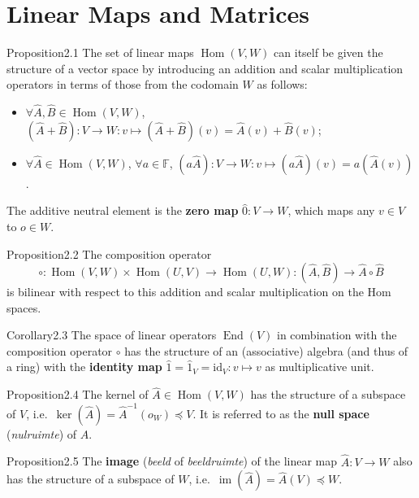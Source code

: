 \section{Linear Maps and Matrices}

\begin{res}{Proposition}{2.1}
The set of linear maps $\operatorname{Hom}(V,W)$ can itself be given the structure of a vector space by introducing an addition and scalar multiplication operators in terms of those from the codomain $W$ as follows:
\begin{itemize}
\item $\forall\hat A,\hat B\in\operatorname{Hom}(V,W)$, $(\hat A+\hat B):V\to W:v\mapsto(\hat A+\hat B)(v)=\hat A(v)+\hat B(v)$;
\item $\forall\hat A\in\operatorname{Hom}(V,W)$, $\forall a\in\mathbb F$, $(a\hat A):V\to W:v\mapsto(a\hat A)(v)=a(\hat A(v))$.
\end{itemize}
The additive neutral element is the \textbf{zero map} $\hat 0:V\to W$, which maps any $v\in V$ to $o\in W$.
\end{res}

\begin{res}{Proposition}{2.2}
The composition operator
\[\circ:\operatorname{Hom}(V,W)\times\operatorname{Hom}(U,V)\to\operatorname{Hom}(U,W):(\hat A,\hat B)\to\hat A\circ\hat B\]
is bilinear with respect to this addition and scalar multiplication on the Hom spaces.
\end{res}

\begin{res}{Corollary}{2.3}
The space of linear operators $\operatorname{End}(V)$ in combination with the composition operator $\circ$ has the structure of an (associative) algebra (and thus of a ring) with the \textbf{identity map} $\hat 1=\hat 1_V=\mathrm{id}_V:v\mapsto v$ as multiplicative unit.
\end{res}

\begin{res}{Proposition}{2.4}
The kernel of $\hat A\in\operatorname{Hom}(V,W)$ has the structure of a subspace of $V$, i.e.\ $\ker(\hat A)=\hat A^{-1}(o_W)\preccurlyeq V$. It is referred to as the \textbf{null space} (\textit{nulruimte}) of $\hat A$.
\end{res}

\begin{res}{Proposition}{2.5}
The \textbf{image} (\textit{beeld} of \textit{beeldruimte}) of the linear map $\hat A:V\to W$ also has the structure of a subspace of $W$, i.e.\ $\operatorname{im}(\hat A)=\hat A(V)\preccurlyeq W$.
\end{res}

